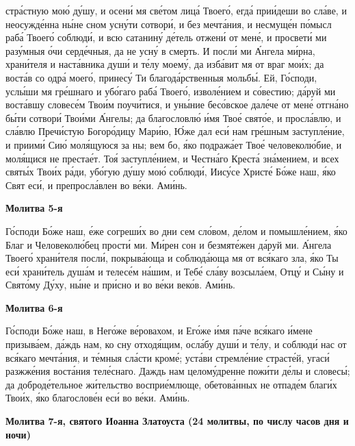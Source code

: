 стра́стную мою́ ду́шу, и осени́ мя све́том лица́ Твоего́, егда́ прии́деши во
сла́ве, и неосужде́нна ны́не сном усну́ти сотвори́, и без мечта́ния, и
несмуще́н по́мысл раба́ Твоего́ соблюди́, и всю сатанину́ де́тель отжени́ от
мене́, и просвети́ ми разу́мныя о́чи серде́чныя, да не усну́ в смерть. И
посли́ ми А́нгела ми́рна, храни́теля и наста́вника души́ и те́лу моему́,
да изба́вит мя от враг мои́х; да воста́в со одра́ моего́, принесу́ Ти
благода́рственныя мольбы́. Ей, Го́споди, услы́ши мя гре́шнаго и убо́гаго раба́
Твоего́, изволе́нием и со́вестию; да́руй ми воста́вшу словесе́м Твои́м
поучи́тися, и уны́ние бесо́вское дале́че от мене́ отгна́но бы́ти сотвори́
Твои́ми А́нгелы; да благословлю́ и́мя Твое́ свято́е, и просла́влю, и
сла́влю Пречи́стую Богоро́дицу Мари́ю, Ю́же дал еси́ нам гре́шным
заступле́ние, и приими́ Сию́ моля́щуюся за ны; вем бо, я́ко подража́ет Твое́
человеколю́бие, и моля́щися не престае́т. Тоя́ заступле́нием, и Честна́го
Креста́ зна́мением, и всех святы́х Твои́х ра́ди, убо́гую ду́шу мою́ соблюди́,
Иису́се Христе́ Бо́же наш, я́ко Свят еси́, и препросла́влен во ве́ки.
Ами́нь.



 

\bfseries Молитва 5-я\normalfont{}


   Го́споди Бо́же наш, е́же согреши́х во дни сем сло́вом, де́лом и
помышле́нием, я́ко Благ и Человеколю́бец прости́ ми. Ми́рен сон и
безмяте́жен да́руй ми. А́нгела Твоего́ храни́теля посли́, покрыва́юща и
соблюда́юща мя от вся́каго зла, я́ко Ты еси́ храни́тель душа́м и телесе́м
на́шим, и Тебе́ сла́ву возсыла́ем, Отцу́ и Сы́ну и Свято́му Ду́ху, ны́не и
при́сно и во ве́ки веко́в. Ами́нь.



 

\bfseries Молитва 6-я\normalfont{}


   Го́споди Бо́же наш, в Него́же ве́ровахом, и Его́же и́мя па́че вся́каго и́мене
призыва́ем, да́ждь нам, ко сну отходя́щим, осла́бу души́ и те́лу, и соблюди́
нас от вся́каго мечта́ния, и те́мныя сла́сти кроме́; уста́ви стремле́ние
страсте́й, угаси́ разжже́ния воста́ния теле́снаго. Даждь нам целому́дренне
пожи́ти де́лы и словесы́; да доброде́тельное жи́тельство восприе́млюще,
обетова́нных не отпаде́м благи́х Твои́х, я́ко благослове́н еси́ во ве́ки.
Ами́нь.




 

\bfseries Молитва 7-я, святого Иоанна Златоуста (24 молитвы, по числу часов дня
и ночи)\normalfont{}


